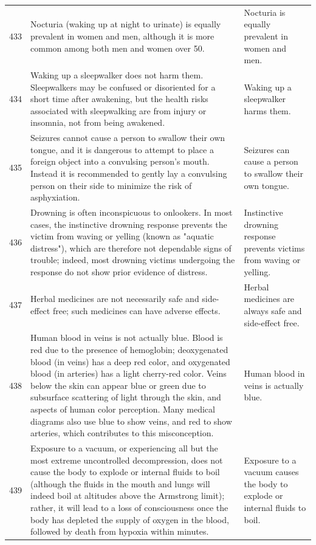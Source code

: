 \begin{tabular}{c|p{}|p{}}
433 & Nocturia (waking up at night to urinate) is equally prevalent in women and men, although it is more common among both men and women over 50. & Nocturia is equally prevalent in women and men. \\
434 & Waking up a sleepwalker does not harm them. Sleepwalkers may be confused or disoriented for a short time after awakening, but the health risks associated with sleepwalking are from injury or insomnia, not from being awakened. & Waking up a sleepwalker harms them. \\
435 & Seizures cannot cause a person to swallow their own tongue, and it is dangerous to attempt to place a foreign object into a convulsing person's mouth. Instead it is recommended to gently lay a convulsing person on their side to minimize the risk of asphyxiation. & Seizures can cause a person to swallow their own tongue. \\
436 & Drowning is often inconspicuous to onlookers. In most cases, the instinctive drowning response prevents the victim from waving or yelling (known as "aquatic distress"), which are therefore not dependable signs of trouble; indeed, most drowning victims undergoing the response do not show prior evidence of distress. & Instinctive drowning response prevents victims from waving or yelling. \\
437 & Herbal medicines are not necessarily safe and side-effect free; such medicines can have adverse effects. & Herbal medicines are always safe and side-effect free. \\
438 & Human blood in veins is not actually blue. Blood is red due to the presence of hemoglobin; deoxygenated blood (in veins) has a deep red color, and oxygenated blood (in arteries) has a light cherry-red color. Veins below the skin can appear blue or green due to subsurface scattering of light through the skin, and aspects of human color perception. Many medical diagrams also use blue to show veins, and red to show arteries, which contributes to this misconception. & Human blood in veins is actually blue. \\
439 & Exposure to a vacuum, or experiencing all but the most extreme uncontrolled decompression, does not cause the body to explode or internal fluids to boil (although the fluids in the mouth and lungs will indeed boil at altitudes above the Armstrong limit); rather, it will lead to a loss of consciousness once the body has depleted the supply of oxygen in the blood, followed by death from hypoxia within minutes. & Exposure to a vacuum causes the body to explode or internal fluids to boil. \\

\end{tabular}
